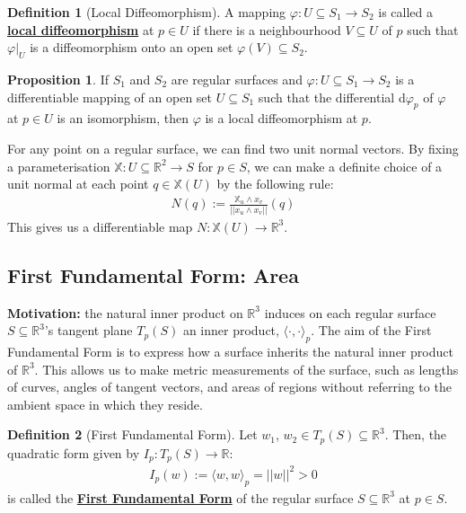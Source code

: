 \documentclass[11pt]{scrartcl}
\newcommand{\R}[0]{\mathbb{R}}
\theoremstyle{definition}
\newtheorem{definition}{Definition}
\newtheorem{prop}{Proposition}
\theoremstyle{remark}
\newcommand{\dfn}[1]{\textbf{\underline{#1}}}
\begin{document}
{\begin{definition}[Local Diffeomorphism] 
	A mapping $\varphi: U \subseteq S_1 \rightarrow S_2$ is called a \dfn{local diffeomorphism} at $p \in U$ if there is a neighbourhood $V \subseteq U$ of $p$ such that $\varphi|_U$ is a diffeomorphism onto an open set $\varphi(V) \subseteq S_2$. 
\end{definition}

\begin{prop}
	If $S_1$ and $S_2$ are regular surfaces and $\varphi: U \subseteq S_1 \rightarrow S_2$ is a differentiable mapping of an open set $U \subseteq S_1$ such that the differential d$\varphi_p$ of $\varphi$ at $p \in U$ is an isomorphism, then $\varphi$ is a local diffeomorphism at $p$. 
\end{prop}

For any point on a regular surface, we can find two unit normal vectors. By fixing a parameterisation $\mathbb{X}: U \subseteq \R^2 \rightarrow S$ for $p \in S$, we can make a definite choice of a unit normal at each point $q \in \mathbb{X}(U)$ by the following rule: 
\begin{align}
	N(q) := \frac{\mathbb{X}_u \wedge x_v}{|| x_u \wedge x_v ||} (q) 	
\end{align}
This gives us a differentiable map $N: \mathbb{X}(U) \rightarrow \R^3$. 



\subsection{First Fundamental Form: Area}
\textbf{Motivation:} the natural inner product on $\R^3$ induces on each regular surface $S \subseteq \R^3$'s tangent plane $T_p(S)$ an inner product, $\langle \cdot, \cdot \rangle_p$. The aim of the First Fundamental Form is to express how a surface inherits the natural inner product of $\R^3$. This allows us to make metric measurements of the surface, such as lengths of curves, angles of tangent vectors, and areas of regions without referring to the ambient space in which they reside.  


\begin{definition}[First Fundamental Form]
	Let $w_1$, $w_2 \in T_p(S) \subseteq \R^3$. Then, the quadratic form given by $I_p: T_p(S) \rightarrow \R$: 
	\begin{align}
		I_p(w) := \langle w, w \rangle_p = || w ||^2 > 0 	
	\end{align}
	is called the \dfn{First Fundamental Form} of the regular surface $S \subseteq \R^3$ at $p \in S$. 
\end{definition}

}
\end{document}
